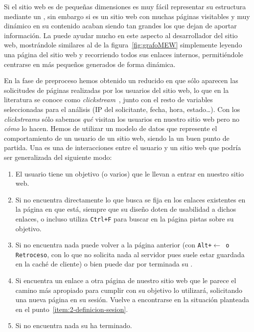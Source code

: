 Si el sitio web es de pequeñas dimensiones es muy fácil representar su estructura mediante un \grafo, sin embargo si es un sitio web con muchas páginas visitables y muy dinámico en su contenido acaban siendo tan grandes los \grafos que dejan de aportar información. La \wsm puede ayudar mucho en este aspecto al desarrollador del sitio web, mostrándole \grafos similares al de la figura~\ref{fig:grafoMEW} simplemente leyendo una página del sitio web y recorriendo todos sus enlaces internos, permitiéndole centrarse en \grafos más pequeños generados de forma dinámica.





En la fase de preproceso hemos obtenido un \flog reducido en que sólo aparecen las solicitudes de páginas realizadas por los usuarios del sitio web, lo que en la literatura se conoce como \emph{clickstream}~\citep{BucklinSismeiro-AModelOfWebSiteBrowsing-2001}, junto con el resto de variables seleccionadas para el análisis (IP del solicitante, fecha, hora, estado\ldots). Con los \emph{clickstreams} sólo sabemos \emph{qué} visitan los usuarios en nuestro sitio web pero no \emph{cómo} lo hacen. Hemos de utilizar un modelo de datos que represente el comportamiento de un usuario de un sitio web, siendo la \sn un buen punto de partida. Una \sn es una \secuencia de interacciones entre el usuario y un sitio web que podría ser generalizada del siguiente modo:
\begin{enumerate}
	\item El usuario tiene un objetivo (o varios) que le llevan a entrar en nuestro sitio web.
	\item Si no encuentra directamente lo que busca se fija en los enlaces existentes en la página en que está, siempre que su diseño doten de usabilidad a dichos enlaces, o incluso utiliza \texttt{Ctrl+F} para buscar en la página pistas sobre su objetivo.\label{item:2-definicion-sesion}
   \item Si no encuentra nada puede volver a la página anterior (con \texttt{Alt+$\leftarrow$ o \texttt{Retroceso}}, con lo que no solicita nada al servidor pues suele estar guardada en la caché de cliente) o bien puede dar por terminada su \sn.
	\item Si encuentra un enlace a otra página de nuestro sitio web que le parece el camino más apropiado para cumplir con su objetivo lo utilizará, solicitando una nueva página en su sesión. Vuelve a encontrarse en la situación planteada en el punto~\ref{item:2-definicion-sesion}.
   \item Si no encuentra nada su \sn ha terminado.
\end{enumerate}

